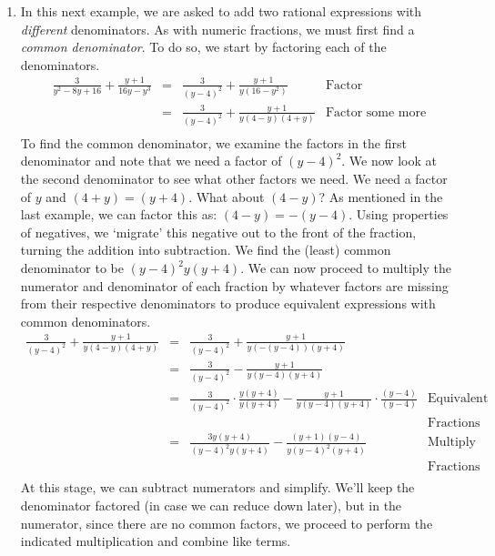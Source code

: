 \documentclass{ximera}
\begin{document}
\begin{example}
\begin{explanation}
\begin{enumerate}
\item  	In this next example, we are asked to add two rational expressions with \textit{different} denominators.  As with numeric fractions, we must first find a \textit{common denominator}. To do so, we start by factoring each of the denominators. \[ \begin{array}{rclr}

\frac{3}{y^2 - 8y + 16} + \frac{y+1}{16y - y^3} & = & \frac{3}{(y-4)^2} + \frac{y+1}{y(16 - y^2)} & \text{Factor} \\	 		
                                                  & = & \frac{3}{(y-4)^2} + \frac{y+1}{y(4-y)(4+y)} & \text{Factor some more} \\
																									
																									\end{array}\]
To find the common denominator, we examine the factors in the first denominator and note that we need a factor of $(y-4)^2$.  We now look at the second denominator to see what other factors we need. We need a factor of $y$ and $(4+y) = (y+4)$.  What about $(4-y)$?  As mentioned in the last example, we can factor this as: $(4-y) = -(y-4)$. Using properties of negatives, we `migrate' this negative out to the front of the fraction, turning the addition into subtraction.  We find the (least) common denominator to be $(y-4)^2 y (y+4)$.  We can now proceed to multiply the numerator and denominator of each fraction by whatever factors are missing from their respective denominators to produce equivalent expressions with common denominators. \[ \begin{array}{rclr}

\frac{3}{(y-4)^2} + \frac{y+1}{y(4-y)(4+y)} & = & \frac{3}{(y-4)^2} + \frac{y+1}{y(-(y-4))(y+4)} &   \\  
																							& = & \frac{3}{(y-4)^2} - \frac{y+1}{y(y-4)(y+4)} & \\  
																							& = & \frac{3}{(y-4)^2} \cdot \frac{y(y+4)}{y(y+4)} - \frac{y+1}{y(y-4)(y+4)} \cdot \frac{(y-4)}{(y-4)} & \text{Equivalent} \\                                              &   &                                                                                                       & \text{Fractions} \\
																						& = & \frac{3y(y+4)}{(y-4)^2y(y+4)}  - \frac{(y+1)(y-4)}{y(y-4)^2(y+4)}  & \text{Multiply} \\  
																						&   &                                                                      & \text{Fractions} \\	\end{array}\] At this stage, we can subtract numerators and simplify. We'll keep the denominator factored (in case we can reduce down later), but in the numerator, since there are no common factors, we proceed to perform the indicated multiplication and combine like terms.\[ \begin{array}{rclr}


\end{array}\]
\end{enumerate}
\end{explanation}
\end{example}
\end{document}
